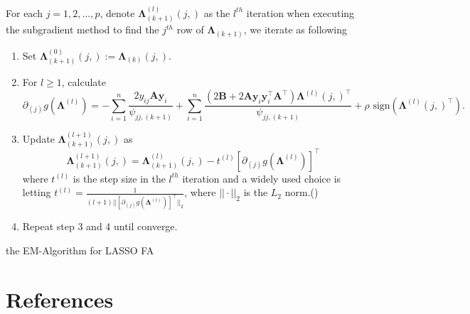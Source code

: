 \documentclass[
  a4paper,
  oneside,
  openany,
  12pt,
  onecolumn]{book}
\providecommand{\tightlist}{%
  \setlength{\itemsep}{0pt}\setlength{\parskip}{0pt}}\usepackage{longtable,booktabs,array}
\theoremstyle{plain}
\theoremstyle{remark}
\begin{document}
\begin{tcolorbox}[enhanced jigsaw, bottomrule=.15mm, rightrule=.15mm, toprule=.15mm, bottomtitle=1mm, arc=.35mm, opacitybacktitle=0.6, leftrule=.75mm, colframe=quarto-callout-note-color-frame, titlerule=0mm, coltitle=black, opacityback=0, toptitle=1mm, breakable, colback=white, colbacktitle=quarto-callout-note-color!10!white, title=\textcolor{quarto-callout-note-color}{\faInfo}\hspace{0.5em}{algorithm}, left=2mm]

For each \(j=1,2,...,p\), denote
\(\boldsymbol{\Lambda}_{(k+1)}^{(l)}(j,)\) as the \(l^{th}\) iteration
when executing the subgradient method to find the \(j^{th}\) row of
\(\boldsymbol{\Lambda}_{(k+1)}\), we iterate as following

\begin{enumerate}
\def\labelenumi{\arabic{enumi}.}
\tightlist
\item
  Set
  \(\boldsymbol{\Lambda}_{(k+1)}^{(0)}(j,):=\boldsymbol{\Lambda}_{(k)}(j,)\).
\item
  For \(l\geq 1\), calculate \[
  \partial_{(j)}g(\boldsymbol{\Lambda}^{(l)})=-\sum_{i=1}^n\frac{2y_{ij}\boldsymbol{A}\boldsymbol{y}_i}{\psi_{jj,(k+1)}}+\sum_{i=1}^n\frac{(2\boldsymbol{B}+2\boldsymbol{A}\boldsymbol{y}_i\boldsymbol{y}_i^\top\boldsymbol{A}^\top)\boldsymbol{\Lambda}^{(l)}(j,)^\top}{\psi_{jj,(k+1)}}+\rho \text{ sign}(\boldsymbol{\Lambda}^{(l)}(j,)^\top) .
  \]
\item
  Update \(\boldsymbol{\Lambda}_{(k+1)}^{(l+1)}(j,)\) as \[
  \boldsymbol{\Lambda}_{(k+1)}^{(l+1)}(j,)=\boldsymbol{\Lambda}_{(k+1)}^{(l)}(j,)-t^{(l)}[\partial_{(j)}g(\boldsymbol{\Lambda}^{(l)})]^\top
  \] where \(t^{(l)}\) is the step size in the \(l^{th}\) iteration and
  a widely used choice is letting
  \(t^{(l)}=\frac{1}{(l+1)||[\partial_{(j)}g(\boldsymbol{\Lambda}^{(l)})]^\top||_2}\),
  where \(||\cdot||_2\) is the \(L_2\)
  norm.(\citet{boyd2003subgradient})
\item
  Repeat step 3 and 4 until converge.
\end{enumerate}

\end{tcolorbox}

the EM-Algorithm for LASSO FA


\chapter*{References}\label{references-1}


\renewcommand{\bibsection}{}



\backmatter
\end{document}
